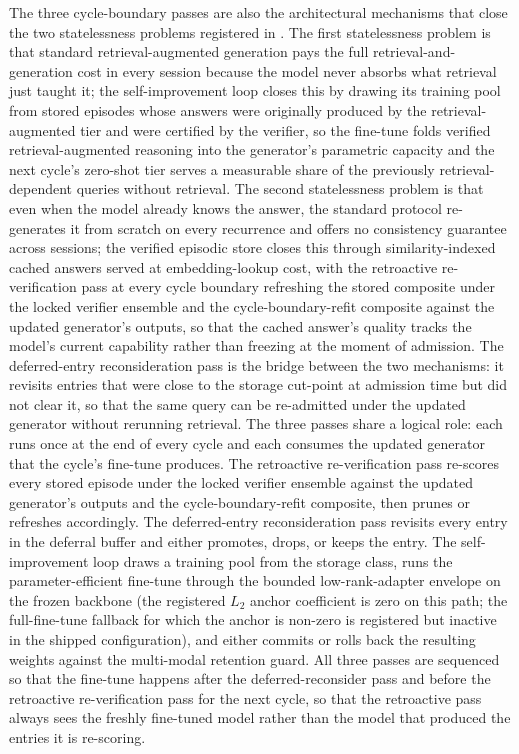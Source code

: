 The three cycle-boundary passes are also the architectural mechanisms that close the two statelessness problems registered in . The first statelessness problem is that standard retrieval-augmented generation pays the full retrieval-and-generation cost in every session because the model never absorbs what retrieval just taught it; the self-improvement loop closes this by drawing its training pool from stored episodes whose answers were originally produced by the retrieval-augmented tier and were certified by the verifier, so the fine-tune folds verified retrieval-augmented reasoning into the generator's parametric capacity and the next cycle's zero-shot tier serves a measurable share of the previously retrieval-dependent queries without retrieval. The second statelessness problem is that even when the model already knows the answer, the standard protocol re-generates it from scratch on every recurrence and offers no consistency guarantee across sessions; the verified episodic store closes this through similarity-indexed cached answers served at embedding-lookup cost, with the retroactive re-verification pass at every cycle boundary refreshing the stored composite under the locked verifier ensemble and the cycle-boundary-refit composite against the updated generator's outputs, so that the cached answer's quality tracks the model's current capability rather than freezing at the moment of admission. The deferred-entry reconsideration pass is the bridge between the two mechanisms: it revisits entries that were close to the storage cut-point at admission time but did not clear it, so that the same query can be re-admitted under the updated generator without rerunning retrieval. The three passes share a logical role: each runs once at the end of every cycle and each consumes the updated generator that the cycle's fine-tune produces. The retroactive re-verification pass re-scores every stored episode under the locked verifier ensemble against the updated generator's outputs and the cycle-boundary-refit composite, then prunes or refreshes accordingly. The deferred-entry reconsideration pass revisits every entry in the deferral buffer and either promotes, drops, or keeps the entry. The self-improvement loop draws a training pool from the storage class, runs the parameter-efficient fine-tune through the bounded low-rank-adapter envelope on the frozen backbone (the registered $L_{2}$ anchor coefficient is zero on this path; the full-fine-tune fallback for which the anchor is non-zero is registered but inactive in the shipped configuration), and either commits or rolls back the resulting weights against the multi-modal retention guard. All three passes are sequenced so that the fine-tune happens after the deferred-reconsider pass and before the retroactive re-verification pass for the next cycle, so that the retroactive pass always sees the freshly fine-tuned model rather than the model that produced the entries it is re-scoring.

